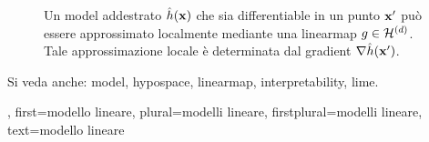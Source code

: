 {{\begin{figure}[H]
\begin{center}
		\vspace*{-5mm}
	\end{center}
	\caption{
		Un \gls{model} addestrato $\hat{h}({\bf x})$ che sia \gls{differentiable} in un punto ${\bf x}'$ 
		può essere approssimato localmente mediante una \gls{linearmap} $g \in \mathcal{H}^{(d)}$. Tale approssimazione locale è 
		determinata dal \gls{gradient} $\nabla \hat{h}({\bf x}')$.}
		\label{fig_linapprox_dict}
	\end{figure}
		Si veda anche: \gls{model}, \gls{hypospace}, \gls{linearmap}, \gls{interpretability}, \gls{lime}.}, 
   first={modello lineare},
   plural={modelli lineare},
   firstplural={modelli lineare}, 
   text={modello lineare}
}
	
